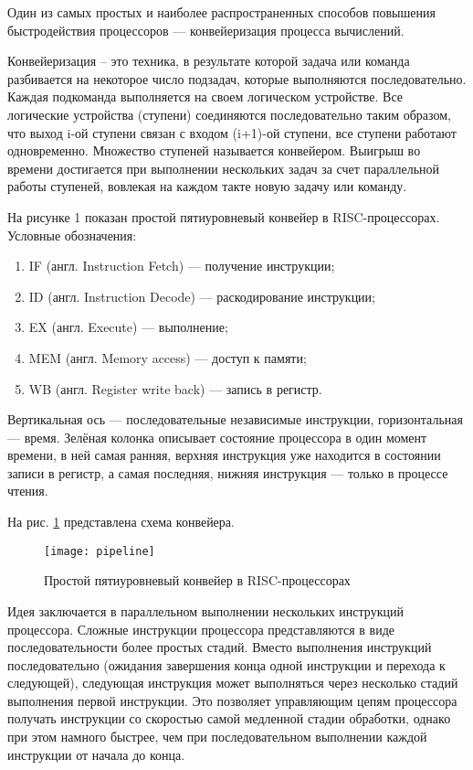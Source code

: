 \documentclass[a4paper, 14pt]{article}
\begin{document}
Один из самых простых и наиболее распространенных способов повышения быстродействия процессоров — конвейеризация процесса вычислений.

Конвейеризация – это техника, в результате которой задача или  команда разбивается  на некоторое число подзадач, которые  выполняются последовательно.
Каждая  подкоманда   выполняется на своем логическом  устройстве.
Все логические устройства (ступени) соединяются последовательно таким образом, что выход i-ой  ступени  связан   с   входом   (i+1)-ой   ступени,  все ступени  работают  одновременно.
Множество  ступеней называется конвейером. Выигрыш во времени достигается при выполнении  нескольких задач  за  счет параллельной   работы   ступеней,  вовлекая  на  каждом такте новую задачу или команду.

На рисунке 1 показан простой пятиуровневый конвейер в RISC-процессорах. Условные обозначения:
\begin{enumerate}
	\item IF (англ. Instruction Fetch) — получение инструкции;
	\item ID (англ. Instruction Decode) — раскодирование инструкции;
	\item EX (англ. Execute) — выполнение;
	\item MEM (англ. Memory access) — доступ к памяти;
	\item WB (англ. Register write back) — запись в регистр.
\end{enumerate}

Вертикальная ось — последовательные независимые инструкции, горизонтальная — время. Зелёная колонка описывает состояние процессора в один момент времени, в ней самая ранняя, верхняя инструкция уже находится в состоянии записи в регистр, а самая последняя, нижняя инструкция — только в процессе чтения.

 На рис. \ref{fig:pl} представлена схема конвейера.
    
    \begin{figure}[H]
        	\begin{center}
        		\texttt{[image: pipeline]}
        		\caption{Простой пятиуровневый конвейер в RISC-процессорах}
        		\label{fig:pl}
        	\end{center}
        \end{figure}

Идея заключается в параллельном выполнении нескольких инструкций процессора. Сложные инструкции процессора представляются в виде последовательности более простых стадий. Вместо выполнения инструкций последовательно (ожидания завершения конца одной инструкции и перехода к следующей), следующая инструкция может выполняться через несколько стадий выполнения первой инструкции. Это позволяет управляющим цепям процессора получать инструкции со скоростью самой медленной стадии обработки, однако при этом намного быстрее, чем при последовательном выполнении каждой инструкции от начала до конца.
\end{document}
